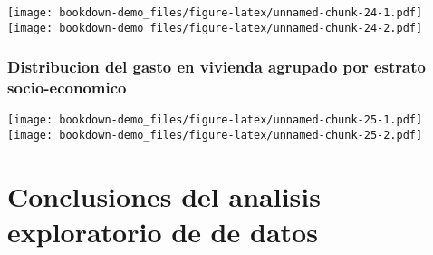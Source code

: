 \documentclass[]{book}
\begin{document}
\texttt{[image: bookdown-demo\_files/figure-latex/unnamed-chunk-24-1.pdf]}
\texttt{[image: bookdown-demo\_files/figure-latex/unnamed-chunk-24-2.pdf]}

\subsubsection{Distribucion del gasto en vivienda agrupado por estrato
socio-economico}\label{distribucion-del-gasto-en-vivienda-agrupado-por-estrato-socio-economico}

\texttt{[image: bookdown-demo\_files/figure-latex/unnamed-chunk-25-1.pdf]}
\texttt{[image: bookdown-demo\_files/figure-latex/unnamed-chunk-25-2.pdf]}

\section{Conclusiones del analisis exploratorio de de
datos}\label{conclusiones-del-analisis-exploratorio-de-de-datos}
\end{document}
